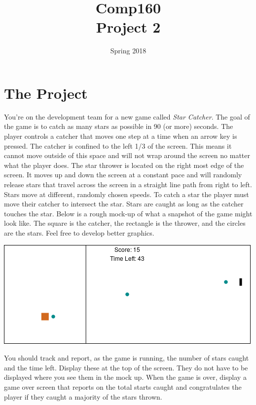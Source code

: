 \documentclass[nobib]{tufte-handout}
\title{Comp160 \\ Project 2 }
\author{}
\date{ Spring 2018 }
\begin{document}
\maketitle

\section*{The Project}

You're on the development team for a new game called \textit{Star Catcher}. The goal of the game is to catch as many stars as possible in 90 (or more) seconds. The player controls a catcher that moves one step at a time when an arrow key is pressed. The catcher is confined to the left 1/3 of the screen. This means it cannot move outside of this space and will not wrap around the screen no matter what the player does. The star thrower is located on the right most edge of the screen. It moves up and down the screen at a constant pace and will randomly release stars that travel across the screen in a straight line path from right to left. Stars move at different, randomly chosen speeds. To catch a star the player must move their catcher to intersect the star. Stars are caught as long as the catcher touches the star. Below is a rough mock-up of what a snapshot of the game might look like. The square is the catcher, the rectangle is the thrower, and the circles are the stars.  Feel free to develop better graphics.

\begin{center}
\includegraphics[scale = 0.75]{starcatcher.png}
\end{center}


You should track and report, as the game is running, the number of stars caught and the time left. Display these at the top of the screen. They do not have to be displayed where you see them in the mock up. When the game is over, display a game over screen that reports on the total starts caught and congratulates the player if they caught a majority of the stars thrown.
\end{document}
